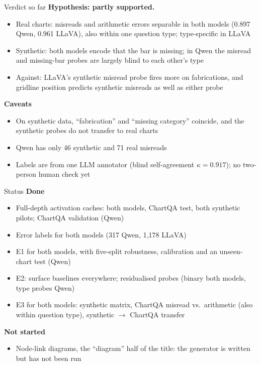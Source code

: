 \documentclass[10pt,aspectratio=169]{beamer}
\begin{document}
\begin{frame}{Verdict so far}
\textbf{Hypothesis: partly supported.}
\begin{itemize}\small
\item Real charts: misreads and arithmetic errors separable in both models
(0.897 Qwen, 0.961 LLaVA), also within one question type; type-specific in LLaVA
\item Synthetic: both models encode that the bar is missing; in Qwen the
misread and missing-bar probes are largely blind to each other's type
\item Against: LLaVA's synthetic misread probe fires more on fabrications, and
gridline position predicts synthetic misreads as well as either probe
\end{itemize}
\vspace{0.5em}
\textbf{Caveats}
\begin{itemize}\small
\item On synthetic data, ``fabrication'' and ``missing category'' coincide, and
the synthetic probes do not transfer to real charts
\item Qwen has only 46 synthetic and 71 real misreads
\item Labels are from one LLM annotator (blind self-agreement $\kappa=0.917$);
no two-person human check yet
\end{itemize}
\end{frame}

\begin{frame}{Status}
\textbf{Done}
\begin{itemize}\small
\item Full-depth activation caches: both models, ChartQA test, both synthetic
pilots; ChartQA validation (Qwen)
\item Error labels for both models (317 Qwen, 1,178 LLaVA)
\item E1 for both models, with five-split robustness, calibration and an
unseen-chart test (Qwen)
\item E2: surface baselines everywhere; residualised probes (binary both
models, type probes Qwen)
\item E3 for both models: synthetic matrix, ChartQA misread vs.\ arithmetic
(also within question type), synthetic $\to$ ChartQA transfer
\end{itemize}
\textbf{Not started}
\begin{itemize}\small
\item Node-link diagrams, the ``diagram'' half of the title: the generator is
written but has not been run
\end{itemize}
\end{frame}
\end{document}
